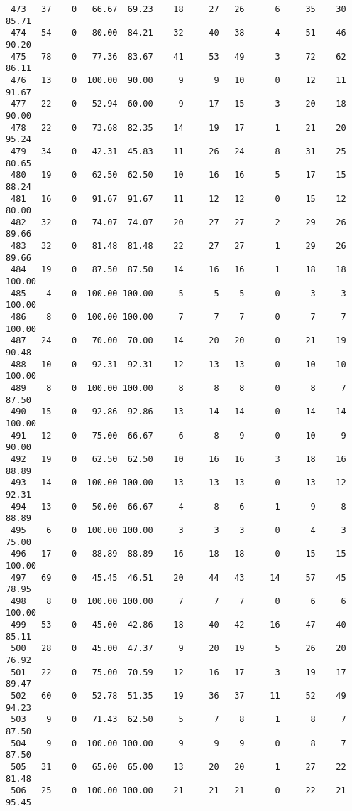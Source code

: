 \begin{verbatim}
 473   37    0   66.67  69.23    18     27   26      6     35    30    85.71
 474   54    0   80.00  84.21    32     40   38      4     51    46    90.20
 475   78    0   77.36  83.67    41     53   49      3     72    62    86.11
 476   13    0  100.00  90.00     9      9   10      0     12    11    91.67
 477   22    0   52.94  60.00     9     17   15      3     20    18    90.00
 478   22    0   73.68  82.35    14     19   17      1     21    20    95.24
 479   34    0   42.31  45.83    11     26   24      8     31    25    80.65
 480   19    0   62.50  62.50    10     16   16      5     17    15    88.24
 481   16    0   91.67  91.67    11     12   12      0     15    12    80.00
 482   32    0   74.07  74.07    20     27   27      2     29    26    89.66
 483   32    0   81.48  81.48    22     27   27      1     29    26    89.66
 484   19    0   87.50  87.50    14     16   16      1     18    18   100.00
 485    4    0  100.00 100.00     5      5    5      0      3     3   100.00
 486    8    0  100.00 100.00     7      7    7      0      7     7   100.00
 487   24    0   70.00  70.00    14     20   20      0     21    19    90.48
 488   10    0   92.31  92.31    12     13   13      0     10    10   100.00
 489    8    0  100.00 100.00     8      8    8      0      8     7    87.50
 490   15    0   92.86  92.86    13     14   14      0     14    14   100.00
 491   12    0   75.00  66.67     6      8    9      0     10     9    90.00
 492   19    0   62.50  62.50    10     16   16      3     18    16    88.89
 493   14    0  100.00 100.00    13     13   13      0     13    12    92.31
 494   13    0   50.00  66.67     4      8    6      1      9     8    88.89
 495    6    0  100.00 100.00     3      3    3      0      4     3    75.00
 496   17    0   88.89  88.89    16     18   18      0     15    15   100.00
 497   69    0   45.45  46.51    20     44   43     14     57    45    78.95
 498    8    0  100.00 100.00     7      7    7      0      6     6   100.00
 499   53    0   45.00  42.86    18     40   42     16     47    40    85.11
 500   28    0   45.00  47.37     9     20   19      5     26    20    76.92
 501   22    0   75.00  70.59    12     16   17      3     19    17    89.47
 502   60    0   52.78  51.35    19     36   37     11     52    49    94.23
 503    9    0   71.43  62.50     5      7    8      1      8     7    87.50
 504    9    0  100.00 100.00     9      9    9      0      8     7    87.50
 505   31    0   65.00  65.00    13     20   20      1     27    22    81.48
 506   25    0  100.00 100.00    21     21   21      0     22    21    95.45

\end{verbatim}
